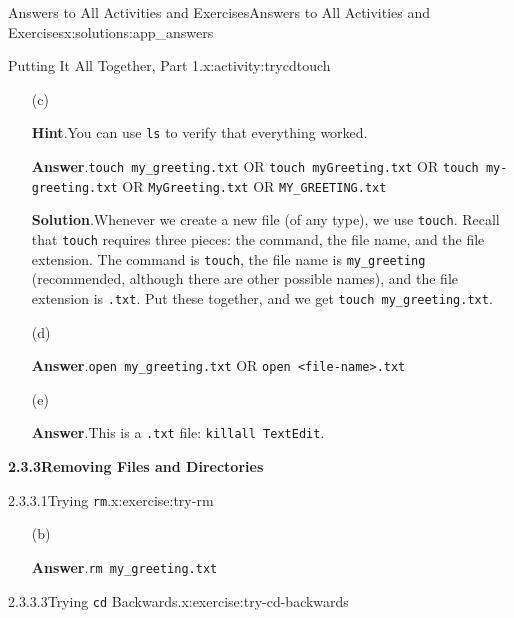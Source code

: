\documentclass[oneside,10pt,]{book}
\newcommand{\blocktitlefont}{\relax}
\newcommand{\mono}[1]{\texttt{#1}}
\begin{document}
\begin{solutions-chapter}{Answers to All Activities and Exercises}{}{Answers to All Activities and Exercises}{}{}{x:solutions:app_answers}
\begin{activitysolution}{2.2}{Putting It All Together, Part 1.}{x:activity:trycdtouch}
\begin{enumerate}[font=\bfseries,label=(\alph*),ref=\alph*]
\begin{codedisplay}
/c/Users/<your-username>/Desktop/testdir
\end{codedisplay}
%
\item[(c)]\par\smallskip%
\noindent\textbf{\blocktitlefont Hint}.\hypertarget{g:hint:idp615506712-back}{}\quad{}You can use \mono{ls} to verify that everything worked.%
\par\smallskip%
\noindent\textbf{\blocktitlefont Answer}.\hypertarget{g:answer:idp615503640-back}{}\quad{}\mono{touch my\_greeting.txt} OR \mono{touch myGreeting.txt} OR \mono{touch my-greeting.txt} OR \mono{MyGreeting.txt} OR \mono{MY\_GREETING.txt}%
\par\smallskip%
\noindent\textbf{\blocktitlefont Solution}.\hypertarget{g:solution:idp615043624-back}{}\quad{}Whenever we create a new file (of any type), we use \mono{touch}. Recall that \mono{touch} requires three pieces: the command, the file name, and the file extension. The command is \mono{touch}, the file name is \mono{my\_greeting} (recommended, although there are other possible names), and the file extension is \mono{.txt}. Put these together, and we get \mono{touch my\_greeting.txt}.%
\item[(d)]\par\smallskip%
\noindent\textbf{\blocktitlefont Answer}.\hypertarget{g:answer:idp615541656-back}{}\quad{}\mono{open my\_greeting.txt} OR \mono{open <file-name>.txt}%
\item[(e)]\par\smallskip%
\noindent\textbf{\blocktitlefont Answer}.\hypertarget{g:answer:idp615537560-back}{}\quad{}This is a \mono{.txt} file: \mono{killall TextEdit}.%
\end{enumerate}
\end{activitysolution}%
\par\medskip
\noindent\textbf{\Large{}2.3.3\space\textperiodcentered\space{}Removing Files and Directories}
\begin{inlinesolution}{2.3.3.1}{Trying \mono{rm}.}{x:exercise:try-rm}%
\begin{enumerate}[font=\bfseries,label=(\alph*),ref=\alph*]
\item[(b)]\par\smallskip%
\noindent\textbf{\blocktitlefont Answer}.\hypertarget{g:answer:idp615553816-back}{}\quad{}\mono{rm my\_greeting.txt}%
\end{enumerate}
\end{inlinesolution}%
\begin{inlinesolution}{2.3.3.3}{Trying \mono{cd} Backwards.}{x:exercise:try-cd-backwards}%

\end{inlinesolution}
\end{solutions-chapter}
\end{document}
